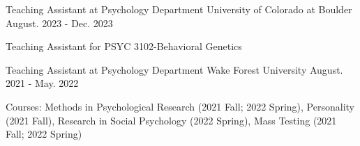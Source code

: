 
\begin{cventries}

  \cventry
    {Teaching Assistant at Psychology Department} %
    {University of Colorado at Boulder} %
    {} %
    {August. 2023 - Dec. 2023} %
    {
      \begin{cvitems} %
        \item {Teaching Assistant for PSYC 3102-Behavioral Genetics}
      \end{cvitems}
    }
  \cventry
    {Teaching Assistant at Psychology Department} %
    {Wake Forest University} %
    {} %
    {August. 2021 - May. 2022} %
    {
      \begin{cvitems} %
        \item {Courses: Methods in Psychological Research (2021 Fall; 2022 Spring), Personality (2021 Fall), Research in Social Psychology (2022 Spring), Mass Testing (2021 Fall; 2022 Spring) }
      \end{cvitems}
    }
    


\end{cventries}
